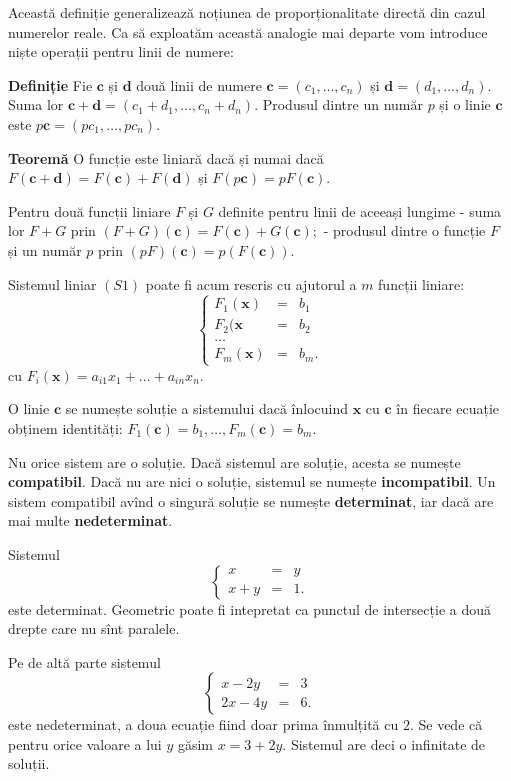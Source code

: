 \documentclass[11pt]{article}
\begin{document}
Această definiție generalizează noțiunea de proporționalitate directă
din cazul numerelor reale. Ca să exploatăm această analogie mai departe
vom introduce niște operații pentru linii de numere:

\textbf{Definiție} Fie \(\mathbf{c}\) și \(\mathbf{d}\) două linii de
numere \(\mathbf{c}=\left(c_1,\dots,c_n\right)\) și
\(\mathbf{d}=\left(d_1,\dots,d_n\right)\). Suma lor
\(\mathbf{c}+\mathbf{d}=\left(c_1+d_1,\dots,c_n+d_n\right)\). Produsul
dintre un număr \(p\) și o linie \(\mathbf{c}\) este
\(p\mathbf{c}=(pc_1,\dots,pc_n)\).

\textbf{Teoremă} O funcție este liniară dacă și numai dacă
\(F(\mathbf{c}+\mathbf{d})=F(\mathbf{c})+F(\mathbf{d})\) și
\(F(p\mathbf{c})=pF(\mathbf{c})\).

Pentru două funcții liniare \(F\) și \(G\) definite pentru linii de
aceeași lungime - suma lor \(F+G\) prin
\((F+G)(\mathbf{c})=F(\mathbf{c})+G(\mathbf{c});\) - produsul dintre o
funcție \(F\) și un număr \(p\) prin
\((pF)(\mathbf{c})=p(F(\mathbf{c})).\)

Sistemul liniar \((S1)\) poate fi acum rescris cu ajutorul a \(m\)
funcții liniare: \[
\left\{\begin{matrix} F_1(\mathbf{x}) & = & b_1 \\
F_2(\mathbf{x} & = & b_2 \\
\ldots \\
F_m(\mathbf{x}) & = & b_m. 
\end{matrix}\right. 
\] cu \(F_i(\mathbf{x})=a_{i1}x_1+\dots+a_{in}x_n.\)

O linie \(\mathbf{c}\) se numește soluție a sistemului dacă înlocuind
\(\mathbf{x}\) cu \(\mathbf{c}\) în fiecare ecuație obținem identități:
\(F_1(\mathbf{c})=b_1,\dots, F_m(\mathbf{c})=b_m\).

Nu orice sistem are o soluție. Dacă sistemul are soluție, acesta se
numește \textbf{compatibil}. Dacă nu are nici o soluție, sistemul se
numește \textbf{incompatibil}. Un sistem compatibil avînd o singură
soluție se numește \textbf{determinat}, iar dacă are mai multe
\textbf{nedeterminat}.

Sistemul \[
\left\{\begin{matrix} x & = & y \\ 
x+y & = & 1.\end{matrix}\right.
\] este determinat. Geometric poate fi intepretat ca punctul de
intersecție a două drepte care nu sînt paralele.

Pe de altă parte sistemul \[
\left\{\begin{matrix} x-2y & = & 3 \\ 
2x-4y & = & 6.\end{matrix}\right.
\] este nedeterminat, a doua ecuație fiind doar prima înmulțită cu
\(2\). Se vede că pentru orice valoare a lui \(y\) găsim \(x=3+2y\).
Sistemul are deci o infinitate de soluții.
\end{document}
